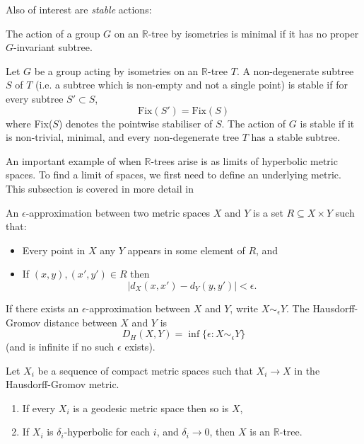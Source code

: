 Also of interest are \textit{stable} actions:
\begin{definition}
    The action of a group $G$ on an $\mathbb{R}$-tree by isometries is \textnormal{minimal} if it has no proper $G$-invariant subtree.
\end{definition}

\begin{definition}
    Let $G$ be a group acting by isometries on an $\mathbb{R}$-tree $T$. A  non-degenerate subtree $S$ of $T$ (i.e. a subtree which is non-empty and not a single point) is \textnormal{stable} if for every subtree $S'\subset S$, \[\text{Fix}(S')=\text{Fix}(S)\] where Fix($S$) denotes the pointwise stabiliser of $S$. The action of $G$ is \textnormal{stable} if it is non-trivial, minimal, and every non-degenerate tree $T$ has a stable subtree.
\end{definition}

An important example of when $\mathbb{R}$-trees arise is as limits of hyperbolic metric spaces. To find a limit of spaces, we first need to define an underlying metric. This subsection is covered in more detail in \cite{BridsonSwarup}

\begin{definition}
    An $\epsilon$\textnormal{-approximation} between two metric spaces $X$ and $Y$ is a set $R\subseteq X\times Y$ such that:
    \begin{itemize}
        \item Every point in $X$ any $Y$ appears in some element of $R$, and
        \item If $(x,y),(x',y')\in R$ then \[\lvert d_X(x,x')-d_Y(y,y')\rvert<\epsilon.\]
    \end{itemize}
    If there exists an $\epsilon$-approximation between $X$ and $Y$, write $X\sim_\epsilon Y$. The \textnormal{Hausdorff-Gromov distance} between $X$ and $Y$ is \[D_H(X,Y)=\inf\{\epsilon:X\sim_\epsilon Y\}\] (and is infinite if no such $\epsilon$ exists).
\end{definition}

\begin{theorem}\label{limittrees}
    Let $X_i$ be a sequence of compact metric spaces such that $X_i\rightarrow X$ in the Hausdorff-Gromov metric.
    \begin{enumerate}
        \item If every $X_i$ is a geodesic metric space then so is $X$,
        \item If $X_i$ is $\delta_i$-hyperbolic for each $i$, and $\delta_i\rightarrow 0$, then $X$ is an $\mathbb{R}$-tree. 
    \end{enumerate}
\end{theorem}

